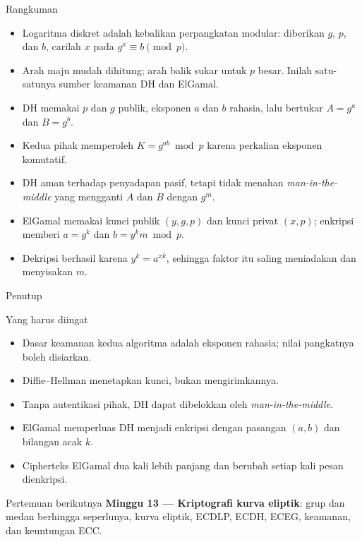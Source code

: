 \documentclass[aspectratio=169,11pt]{beamer}
\begin{document}
\begin{frame}{Rangkuman}
    \footnotesize
    \begin{itemize}
        \item Logaritma diskret adalah kebalikan perpangkatan modular:
              diberikan $g$, $p$, dan $b$, carilah $x$ pada
              $g^{x} \equiv b \pmod p$.
        \item Arah maju mudah dihitung; arah balik sukar untuk $p$ besar.
              Inilah satu-satunya sumber keamanan DH dan ElGamal.
        \item DH memakai $p$ dan $g$ publik, eksponen $a$ dan $b$ rahasia,
              lalu bertukar $A = g^{a}$ dan $B = g^{b}$.
        \item Kedua pihak memperoleh $K = g^{ab} \bmod p$ karena perkalian
              eksponen komutatif.
        \item DH aman terhadap penyadapan pasif, tetapi tidak menahan
              \textit{man-in-the-middle} yang mengganti $A$ dan $B$ dengan
              $g^{m}$.
        \item ElGamal memakai kunci publik $(y,g,p)$ dan kunci privat
              $(x,p)$; enkripsi memberi $a = g^{k}$ dan
              $b = y^{k}m \bmod p$.
        \item Dekripsi berhasil karena $y^{k} = a^{xk}$, sehingga faktor
              itu saling meniadakan dan menyisakan $m$.
    \end{itemize}
\end{frame}

\begin{frame}{Penutup}
    \begin{block}{Yang harus diingat}
        \footnotesize
        \begin{itemize}
            \item Dasar keamanan kedua algoritma adalah eksponen rahasia;
                  nilai pangkatnya boleh disiarkan.
            \item Diffie--Hellman menetapkan kunci, bukan mengirimkannya.
            \item Tanpa autentikasi pihak, DH dapat dibelokkan oleh
                  \textit{man-in-the-middle}.
            \item ElGamal memperluas DH menjadi enkripsi dengan pasangan
                  $(a,b)$ dan bilangan acak $k$.
            \item Cipherteks ElGamal dua kali lebih panjang dan berubah
                  setiap kali pesan dienkripsi.
        \end{itemize}
    \end{block}
    \vspace{0.15cm}
    \begin{exampleblock}{Pertemuan berikutnya}
        \textbf{Minggu 13 --- Kriptografi kurva eliptik}: grup dan medan
        berhingga seperlunya, kurva eliptik, ECDLP, ECDH, ECEG, keamanan,
        dan keuntungan ECC.
    \end{exampleblock}
\end{frame}
\end{document}
